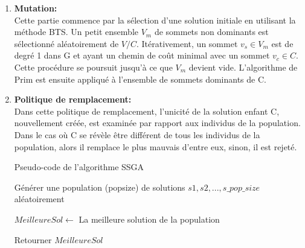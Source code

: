 \begin{enumerate}[label=\alph*)]
	 \item \textbf{Mutation: }\\
	Cette partie commence par la sélection d’une solution initiale en utilisant la méthode BTS. Un petit ensemble $V_m$ de sommets non dominants est sélectionné aléatoirement de $V / C$.  Itérativement, un sommet $v_s \in V_m$ est de degré 1 dans G et ayant un chemin de coût minimal avec un sommet $v_c \in C$. Cette procédure se poursuit jusqu’à ce que $V_m$  devient vide. L’algorithme de Prim est ensuite appliqué à l’ensemble de sommets dominants de C.
	
	\item \textbf{Politique de remplacement:}\\
	Dans cette politique de remplacement, l’unicité de la solution enfant C, nouvellement créée, est examinée par rapport aux individus de la population. Dans le cas où C se révèle être différent de tous les individus de la population, alors il remplace le plus mauvais d’entre eux, sinon, il est rejeté.\\
	

\begin{algorithm}[H]
\label{alg3:PCASSGA}
\caption{ Pseudo-code de l'algorithme SSGA}
\SetAlgoLined
\DontPrintSemicolon
\large


Générer une population (popsize) de solutions $s1 , s2 , ..., s\_pop\_size$ aléatoirement \;

$MeilleureSol \gets $ La meilleure solution de la population \;


Retourner $MeilleureSol$ \;

\end{algorithm}


\end{enumerate}




